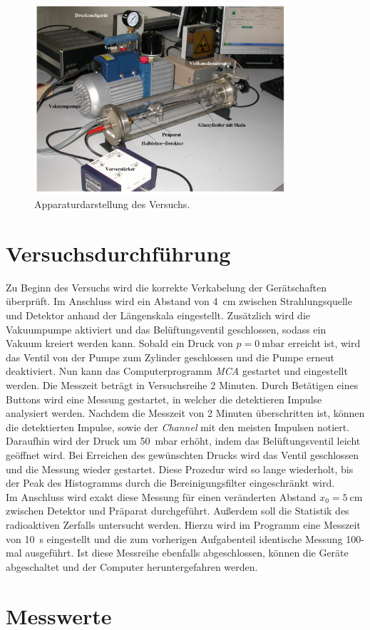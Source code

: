 \begin{figure}[H]
    \centering
    \includegraphics[height=7cm]{Aufbau.png}
    \caption{Apparaturdarstellung des Versuchs\cite{Versuchsanleitung_v701}.}
    \label{fig:Aufbau}
\end{figure}

\section{Versuchsdurchführung}
\label{sec:Versuchsdurchführung}

Zu Beginn des Versuchs wird die korrekte Verkabelung der Gerätschaften überprüft. Im Anschluss wird ein Abstand von \qty{4}{\centi\meter} zwischen 
Strahlungsquelle und Detektor anhand der Längenskala eingestellt. Zusätzlich wird die Vakuumpumpe aktiviert und das Belüftungsventil geschlossen, 
sodass ein Vakuum kreiert werden kann. Sobald ein Druck von $p = \qty{0}{\milli\bar}$ erreicht ist, wird das Ventil von der Pumpe zum Zylinder 
geschlossen und die Pumpe erneut deaktiviert. Nun kann das Computerprogramm \emph{MCA} gestartet und eingestellt werden. Die Messzeit beträgt in 
Versuchsreihe 2 Minuten. Durch Betätigen eines Buttons wird eine Messung gestartet, in welcher die detektieren Impulse analysiert werden. Nachdem 
die Messzeit von 2 Minuten überschritten ist, können die detektierten Impulse, sowie der \emph{Channel} mit den meisten Impulsen notiert. Daraufhin 
wird der Druck um \qty{50}{\milli\bar} erhöht, indem das Belüftungsventil leicht geöffnet wird. Bei Erreichen des gewünschten Drucks wird das Ventil
geschlossen und die Messung wieder gestartet. Diese Prozedur wird so lange wiederholt, bis der Peak des Histogramms durch die Bereinigungsfilter 
eingeschränkt wird.\\

\noindent Im Anschluss wird exakt diese Messung für einen veränderten Abstand $x_0 = \qty{5}{\centi\meter}$ zwischen Detektor und Präparat durchgeführt.
Außerdem soll die Statistik des radioaktiven Zerfalls untersucht werden. Hierzu wird im Programm eine Messzeit von \qty{10}{\second} eingestellt 
und die zum vorherigen Aufgabenteil identische Messung 100-mal ausgeführt. Ist diese Messreihe ebenfalls abgeschlossen, können die Geräte abgeschaltet
und der Computer heruntergefahren werden.   

\section{Messwerte}
\label{sec:Messwerte}





